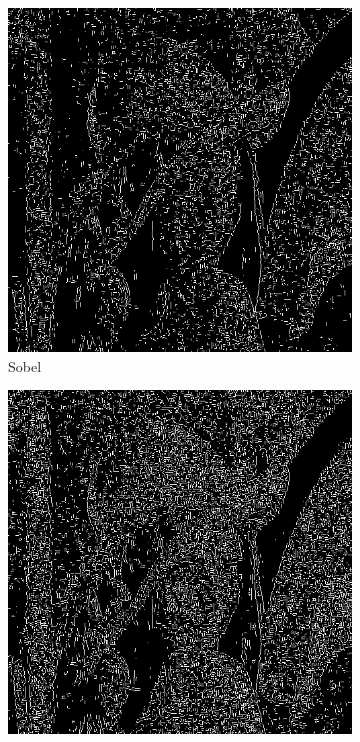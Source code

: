 \documentclass[a4paper]{article}
\begin{document}
\begin{figure}[H]
\centering
	\begin{subfigure}[t]{0.3\textwidth}
	\centering
	\includegraphics[width=\textwidth]{imagenesInforme/lenaHysteresisRayleighSobel}
	\caption{Sobel}
	\end{subfigure}
	\begin{subfigure}[t]{0.3\textwidth}
	\centering
	\includegraphics[width=\textwidth]{imagenesInforme/lenaHysteresisRayleighPrewitt}

\end{subfigure}
\end{figure}
\end{document}
